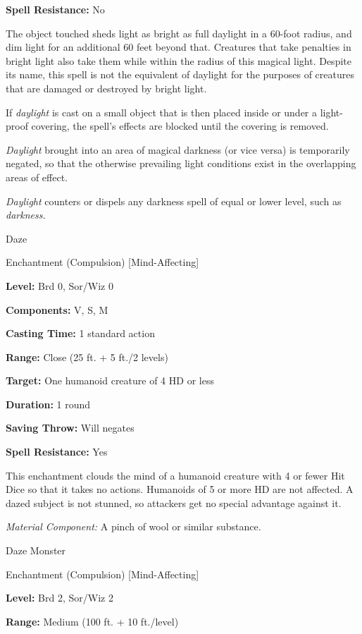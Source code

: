 \documentclass{article}
\begin{document}
\textbf{Spell Resistance:} No

The object touched sheds light as bright as full daylight in a 60-foot radius, 
and dim light for an additional 60 feet beyond that. Creatures that take penalties 
in bright light also take them while within the radius of this magical light. Despite 
its name, this spell is not the equivalent of daylight for the purposes of creatures 
that are damaged or destroyed by bright light.

If \textit{daylight }is cast on a small object that is then placed inside or under 
a light- proof covering, the spell's effects are blocked until the covering is 
removed.

\textit{Daylight }brought into an area of magical darkness (or vice versa) is temporarily 
negated, so that the otherwise prevailing light conditions exist in the overlapping 
areas of effect.

\textit{Daylight }counters or dispels any darkness spell of equal or lower level, 
such as \textit{darkness.}

\vspace{12pt}
Daze

Enchantment (Compulsion) [Mind-Affecting]

\textbf{Level:} Brd 0, Sor/Wiz 0

\textbf{Components:} V, S, M

\textbf{Casting Time:} 1 standard action

\textbf{Range:} Close (25 ft. + 5 ft./2 levels)

\textbf{Target:} One humanoid creature of 4 HD or less

\textbf{Duration:} 1 round

\textbf{Saving Throw: }Will negates

\textbf{Spell Resistance:} Yes

This enchantment clouds the mind of a humanoid creature with 4 or fewer Hit Dice 
so that it takes no actions. Humanoids of 5 or more HD are not affected. A dazed 
subject is not stunned, so attackers get no special advantage against it.

\textit{Material Component: }A pinch of wool or similar substance.

\vspace{12pt}
Daze Monster

Enchantment (Compulsion) [Mind-Affecting]

\textbf{Level:} Brd 2, Sor/Wiz 2

\textbf{Range: }Medium (100 ft. + 10 ft./level)
\end{document}
